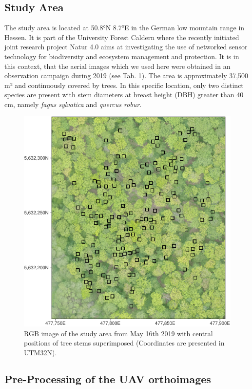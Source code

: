 \documentclass[]{article}
\begin{document}
\hypertarget{study-area}{%
\subsection{Study Area}\label{study-area}}

The study area is located at 50.8°N 8.7°E in the German low mountain
range in Hessen. It is part of the University Forest Caldern where the
recently initiated joint research project Natur 4.0 aims at
investigating the use of networked sensor technology for biodiversity
and ecosystem management and protection. It is in this context, that the
aerial images which we used here were obtained in an observation
campaign during 2019 (see Tab. 1). The area is approximately 37,500 m²
and continuously covered by trees. In this specific location, only two
distinct species are present with stem diameters at breast height (DBH)
greater than 40 cm, namely \emph{fagus sylvatica} and \emph{quercus
robur}.

\begin{figure}[H]

{\centering \includegraphics[width=0.6\linewidth]{report_files/figure-latex/plot_aoi-1} 

}

\caption{RGB image of the study area from May 16th 2019 with central positions of tree stems superimposed (Coordinates are presented in UTM32N).}\label{fig:plot_aoi}
\end{figure}

\hypertarget{pre-processing-of-the-uav-orthoimages}{%
\subsection{Pre-Processing of the UAV
orthoimages}\label{pre-processing-of-the-uav-orthoimages}}
\end{document}
